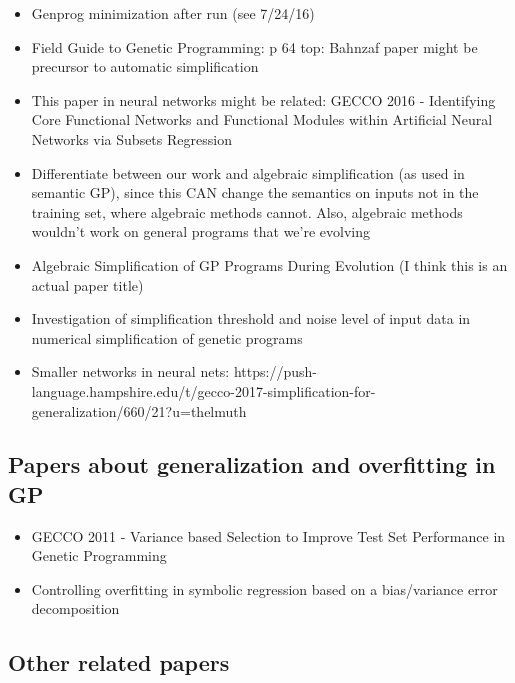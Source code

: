 \begin{itemize}

\item
Genprog minimization after run (see 7/24/16)

\item
Field Guide to Genetic Programming: p 64 top: Bahnzaf paper might be precursor to automatic simplification

\item
This paper in neural networks might be related: GECCO 2016 - Identifying Core Functional Networks and Functional Modules within Artificial Neural Networks via Subsets Regression

\item
Differentiate between our work and algebraic simplification (as used in semantic GP), since this CAN change the semantics on inputs not in the training set, where algebraic methods cannot. Also, algebraic methods wouldn't work on general programs that we're evolving

\item
Algebraic Simplification of GP Programs During Evolution (I think this is an actual paper title)

\item
Investigation of simplification threshold and noise level of input data in numerical simplification of genetic programs \cite{Kinzett:2010:cec}

\item
Smaller networks in neural nets: https://push-language.hampshire.edu/t/gecco-2017-simplification-for-generalization/660/21?u=thelmuth

\end{itemize}

\subsection{Papers about generalization and overfitting in GP}

\begin{itemize}
\item
GECCO 2011 - Variance based Selection to Improve Test Set Performance in Genetic Programming

\item
Controlling overfitting in symbolic regression based on a bias/variance error decomposition


\end{itemize}

\subsection{Other related papers}

